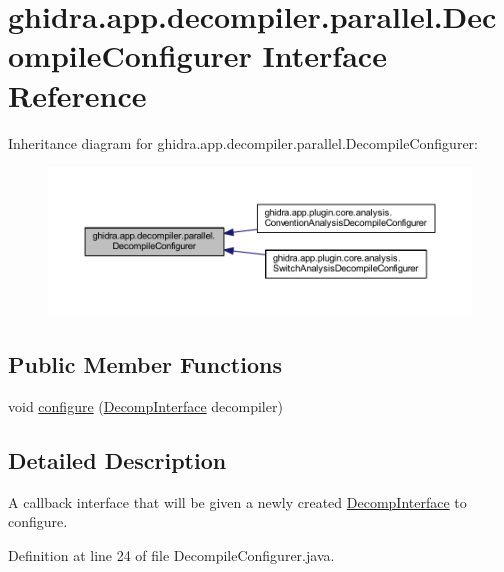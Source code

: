 \hypertarget{interfaceghidra_1_1app_1_1decompiler_1_1parallel_1_1_decompile_configurer}{}\section{ghidra.\+app.\+decompiler.\+parallel.\+Decompile\+Configurer Interface Reference}
\label{interfaceghidra_1_1app_1_1decompiler_1_1parallel_1_1_decompile_configurer}


Inheritance diagram for ghidra.\+app.\+decompiler.\+parallel.\+Decompile\+Configurer\+:
\nopagebreak
\begin{figure}[H]
\begin{center}
\leavevmode
\includegraphics[width=350pt]{interfaceghidra_1_1app_1_1decompiler_1_1parallel_1_1_decompile_configurer__inherit__graph}
\end{center}
\end{figure}
\subsection*{Public Member Functions}
\begin{DoxyCompactItemize}
\item 
void \mbox{\hyperlink{interfaceghidra_1_1app_1_1decompiler_1_1parallel_1_1_decompile_configurer_a168fbd0001569c08cc1008e0b22c8f68}{configure}} (\mbox{\hyperlink{classghidra_1_1app_1_1decompiler_1_1_decomp_interface}{Decomp\+Interface}} decompiler)
\end{DoxyCompactItemize}


\subsection{Detailed Description}
A callback interface that will be given a newly created \mbox{\hyperlink{classghidra_1_1app_1_1decompiler_1_1_decomp_interface}{Decomp\+Interface}} to configure. 

Definition at line 24 of file Decompile\+Configurer.\+java.



